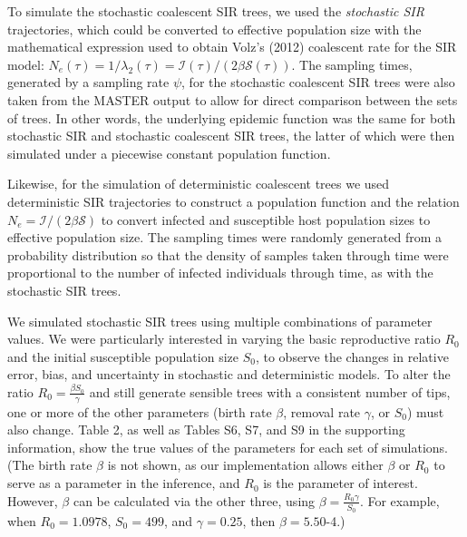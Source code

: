 \documentclass[12pt,titlepage]{article}
\newcommand{\St}{\mathcal{S}}
\newcommand{\It}{\mathcal{I}}
\newcommand{\stochCoalSIR}{stochastic coalescent SIR}
\newcommand{\stochSIR}{stochastic SIR}
\begin{document}
To simulate the \stochCoalSIR{} trees, we used the \textit{stochastic SIR} 
trajectories, which could be converted to effective population size 
with the mathematical expression used to obtain Volz's (2012) coalescent rate for the SIR 
model:  $N_e(\tau) = 1/ \lambda_2(\tau) = \It(\tau)/(2{\beta}\St(\tau))$. 
  The sampling times, generated by a sampling rate $\psi$, for the \stochCoalSIR{} trees were also 
taken from the MASTER output to allow for direct comparison between the sets of trees.  
In other words, the underlying epidemic function was the same for both \stochSIR{} and 
\stochCoalSIR{} trees, the latter of which were then simulated under a piecewise constant population function.

Likewise, for the simulation of deterministic coalescent trees we used deterministic SIR 
trajectories to construct a population function and the relation $N_e = \It/(2{\beta}\St)$ to convert 
infected and susceptible host population sizes to effective population size.  The sampling times were randomly generated 
from a probability distribution so that the density of samples taken through time were 
proportional to the number of infected individuals through time, as with the \stochSIR{} trees.

We simulated stochastic SIR trees using multiple combinations of parameter values.  We were particularly interested in varying the basic reproductive ratio $R_0$ and the initial susceptible population size $S_0$, to observe the changes in relative error, bias, and uncertainty in stochastic and deterministic models. %
To alter the ratio ${R_0} = \frac{\beta S_{0}}{\gamma}$ and still generate sensible trees with a consistent number of tips, one or more of the other parameters (birth rate $\beta$, removal rate $\gamma$, or $S_0$) must also change.  
Table 2, as well as Tables S6, S7, and S9 in the supporting information, show the true values of the parameters for each set of simulations.  (The birth rate $\beta$ is not shown, as our implementation allows either $\beta$ or $R_0$ to serve as a parameter in the inference, and $R_0$ is the parameter of interest.  However, $\beta$ can 
be calculated via the other three, using $\beta = \frac{R_{0} \gamma}{S_{0}}$.  For example, when ${R_0} = 1.0978$, ${S_0}=499$, and $\gamma=0.25$, then $\beta=5.50$\mbox{-4}.)
\end{document}
